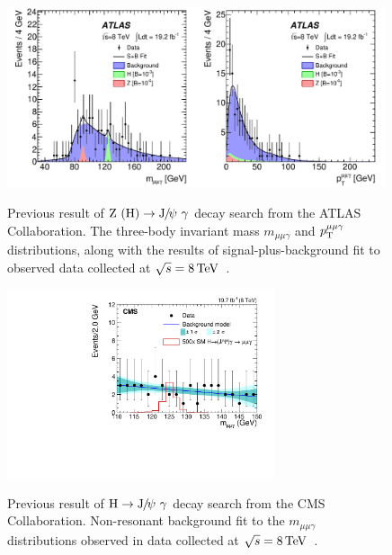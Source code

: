 \begin{figure}[!ht]
  \begin{center}  
    \includegraphics[width=0.99\textwidth]{Fig/PreviousResult/fig_01.pdf}\\
    \caption{Previous result of $\cPZ\ (\PH)\to\JPsi\ \gamma$ decay search from the ATLAS Collaboration. The three-body invariant mass $m_{\mu\mu\gamma}$ and $p_{\mathrm{T}}^{\mu\mu\gamma}$ distributions, along with the results of signal-plus-background fit to observed data collected at $\sqrt{s}=8\,\text{Te\hspace{-.08em}V}$~\cite{Aad:2015sda}.  \label{fig:ATLAS8TeV}}  
  \end{center}
\end{figure}

\begin{figure}[!ht]
  \begin{center}  
    \includegraphics[width=0.7\textwidth]{Fig/PreviousResult/CMS-HIG-14-003_Figure_005.pdf}\\
    \caption{Previous result of $\PH\to\JPsi\ \gamma$ decay search from the CMS Collaboration. Non-resonant background fit to the $m_{\mu\mu\gamma}$ distributions observed in data collected at $\sqrt{s}=8\,\text{Te\hspace{-.08em}V}$~\cite{Aad:2015sda}.}  
    \label{fig:CMS8TeV}
  \end{center}
\end{figure}

